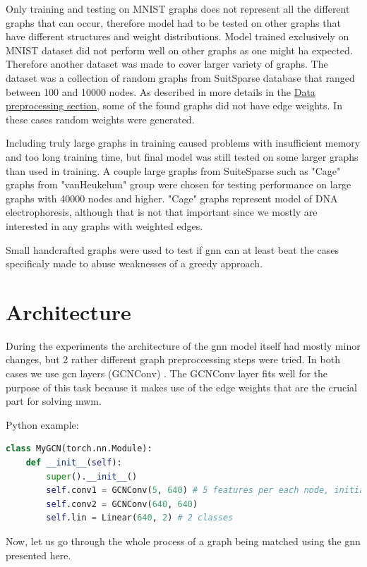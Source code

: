 Only training and testing on MNIST graphs does not represent all the different graphs that can occur, therefore model had to be tested on other graphs that have different structures and weight distributions. Model trained exclusively on MNIST dataset did not perform well on other graphs as one might ha expected. Therefore another dataset was made to cover larger variety of graphs. The dataset was a collection of random graphs from SuitSparse database that ranged between 100 and 10000 nodes. As described in more details in the \hyperref[sec:preprocessing]{Data preprocessing section}, some of the found graphs did not have edge weights. In these cases random weights were generated.

Including truly large graphs in training caused problems with insufficient memory and too long training time, but final model was still tested on some larger graphs than used in training. A couple large graphs from SuiteSparse such as "Cage" graphs from "vanHeukelum" group were chosen for testing performance on large graphs with 40000 nodes and higher. "Cage" graphs represent model of DNA electrophoresis, although that is not that important since we mostly are interested in any graphs with weighted edges.

Small handcrafted graphs were used to test if \gls{gnn} can at least beat the cases specificaly made to abuse weaknesses of a greedy approach.

\section{Architecture}
\label{sec:architecture}
During the experiments the architecture of the \gls{gnn} model itself had mostly minor changes, but 2 rather different graph preproccessing steps were tried. In both cases we use \gls{gcn} layers (GCNConv) \cite{gcnpaper}. The GCNConv layer fits well for the purpose of this task because it makes use of the edge weights that are the crucial part for solving \gls{mwm}.

Python example:
\begin{lstlisting}[language=Python]
class MyGCN(torch.nn.Module):
    def __init__(self):
        super().__init__()
        self.conv1 = GCNConv(5, 640) # 5 features per each node, initialy 1
        self.conv2 = GCNConv(640, 640)
        self.lin = Linear(640, 2) # 2 classes 
\end{lstlisting}

Now, let us go through the whole process of a graph being matched using the \gls{gnn} presented here.

